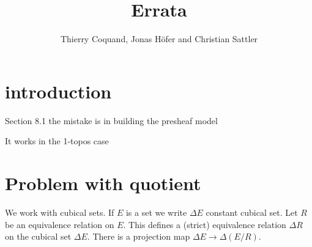 \documentclass[10pt,a4paper]{article}
\begin{document}
\title{Errata}

\author{Thierry Coquand, Jonas H\"ofer and Christian Sattler}
\date{}
\maketitle


\section*{introduction}

Section 8.1 the mistake is in building the presheaf model

It works in the 1-topos case

\section{Problem with quotient}

We work with cubical sets. If $E$ is a set we write $\Delta E$ constant cubical set.
Let $R$ be an equivalence relation on $E$. This defines a (strict) equivalence relation $\Delta R$
on the cubical set $\Delta E$. There is a projection map $\Delta E \rightarrow \Delta (E/R)$.
\end{document}
